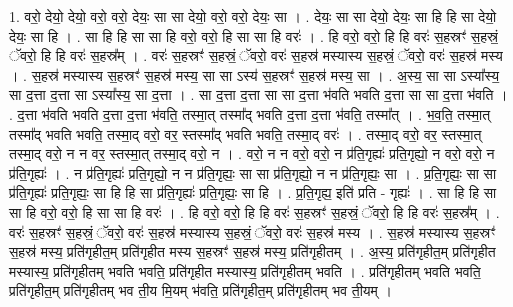 \documentclass[17pt]{extarticle}
\begin{document}
1. वरो॒ देयो॒ देयो॒ वरो॒ वरो॒ देयः॒ सा सा देयो॒ वरो॒ वरो॒ देयः॒ सा । . देयः॒ सा सा देयो॒ देयः॒ सा हि हि सा देयो॒ देयः॒ सा हि । . सा हि हि सा सा हि वरो॒ वरो॒ हि सा सा हि वरः॑ । . हि वरो॒ वरो॒ हि हि वरः॑ स॒हस्रꣳ॑ स॒हस्रं॒ ॅवरो॒ हि हि वरः॑ स॒हस्र᳚म् । . वरः॑ स॒हस्रꣳ॑ स॒हस्रं॒ ॅवरो॒ वरः॑ स॒हस्र॑ मस्यास्य स॒हस्रं॒ ॅवरो॒ वरः॑ स॒हस्र॑ मस्य । . स॒हस्र॑ मस्यास्य स॒हस्रꣳ॑ स॒हस्र॑ मस्य॒ सा सा ऽस्य॑ स॒हस्रꣳ॑ स॒हस्र॑ मस्य॒ सा । . अ॒स्य॒ सा सा ऽस्या᳚स्य॒ सा द॒त्ता द॒त्ता सा ऽस्या᳚स्य॒ सा द॒त्ता । . सा द॒त्ता द॒त्ता सा सा द॒त्ता भ॑वति भवति द॒त्ता सा सा द॒त्ता भ॑वति । . द॒त्ता भ॑वति भवति द॒त्ता द॒त्ता भ॑वति॒ तस्मा॒त् तस्मा᳚द् भवति द॒त्ता द॒त्ता भ॑वति॒ तस्मा᳚त् । . भ॒व॒ति॒ तस्मा॒त् तस्मा᳚द् भवति भवति॒ तस्मा॒द् वरो॒ वर॒ स्तस्मा᳚द् भवति भवति॒ तस्मा॒द् वरः॑ । . तस्मा॒द् वरो॒ वर॒ स्तस्मा॒त् तस्मा॒द् वरो॒ न न वर॒ स्तस्मा॒त् तस्मा॒द् वरो॒ न । . वरो॒ न न वरो॒ वरो॒ न प्र॑ति॒गृह्यः॑ प्रति॒गृह्यो॒ न वरो॒ वरो॒ न प्र॑ति॒गृह्यः॑ । . न प्र॑ति॒गृह्यः॑ प्रति॒गृह्यो॒ न न प्र॑ति॒गृह्यः॒ सा सा प्र॑ति॒गृह्यो॒ न न प्र॑ति॒गृह्यः॒ सा । . प्र॒ति॒गृह्यः॒ सा सा प्र॑ति॒गृह्यः॑ प्रति॒गृह्यः॒ सा हि हि सा प्र॑ति॒गृह्यः॑ प्रति॒गृह्यः॒ सा हि । . प्र॒ति॒गृह्य॒ इति॑ प्रति - गृह्यः॑ । . सा हि हि सा सा हि वरो॒ वरो॒ हि सा सा हि वरः॑ । . हि वरो॒ वरो॒ हि हि वरः॑ स॒हस्रꣳ॑ स॒हस्रं॒ ॅवरो॒ हि हि वरः॑ स॒हस्र᳚म् । . वरः॑ स॒हस्रꣳ॑ स॒हस्रं॒ ॅवरो॒ वरः॑ स॒हस्र॑ मस्यास्य स॒हस्रं॒ ॅवरो॒ वरः॑ स॒हस्र॑ मस्य । . स॒हस्र॑ मस्यास्य स॒हस्रꣳ॑ स॒हस्र॑ मस्य॒ प्रति॑गृहीत॒म् प्रति॑गृहीत मस्य स॒हस्रꣳ॑ स॒हस्र॑ मस्य॒ प्रति॑गृहीतम् । . अ॒स्य॒ प्रति॑गृहीत॒म् प्रति॑गृहीत मस्यास्य॒ प्रति॑गृहीतम् भवति भवति॒ प्रति॑गृहीत मस्यास्य॒ प्रति॑गृहीतम् भवति । . प्रति॑गृहीतम् भवति भवति॒ प्रति॑गृहीत॒म् प्रति॑गृहीतम् भव ती॒य मि॒यम् भ॑वति॒ प्रति॑गृहीत॒म् प्रति॑गृहीतम् भव ती॒यम् । \newline
\end{document}
